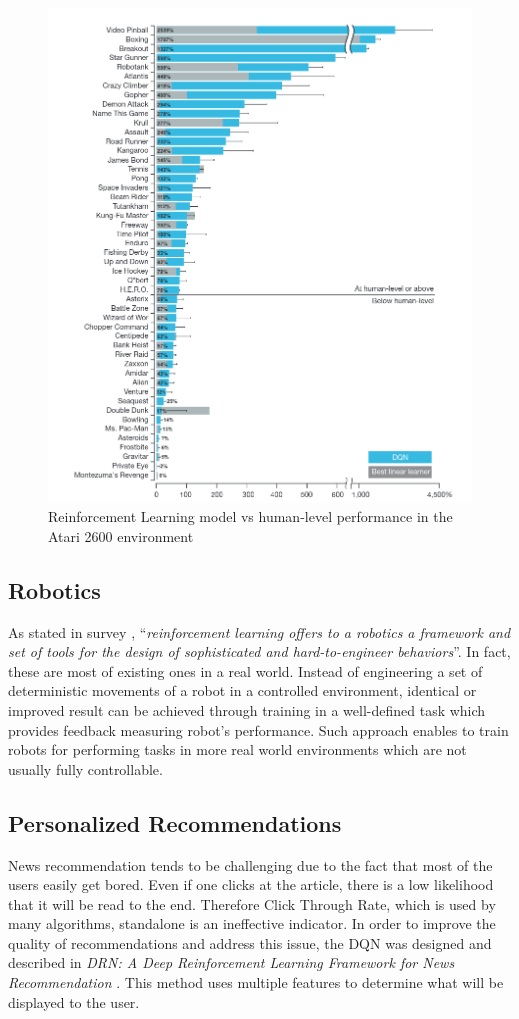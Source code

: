 \begin{figure}[h]
    \includegraphics[width=12cm]{img/Atari2600.png}
    \centering
    \caption{Reinforcement Learning model vs human-level performance in the Atari 2600 environment \cite{DQNAtari}}
    \label{fig:Atari2600}
\end{figure}

\subsection{Robotics}
\label{sub:intro-robotics}
As stated in survey \cite{RNSurvey}, ``\emph{reinforcement learning offers to a robotics a framework and set of tools for the design of sophisticated and hard-to-engineer behaviors}''. In fact, these are most of existing ones in a real world. Instead of engineering a set of deterministic movements of a robot in a controlled environment, identical or improved result can be achieved through training in a well-defined task which provides feedback measuring robot's performance. Such approach enables to train robots for performing tasks in more real world environments which are not usually fully controllable. 

\subsection{Personalized Recommendations}
\label{sub:intro-personalized-reccomendations}
News recommendation tends to be challenging due to the fact that most of the users easily get bored. Even if one clicks at the article, there is a low likelihood that it will be read to the end. Therefore Click Through Rate, which is used by many algorithms, standalone is an ineffective indicator. In order to improve the quality of recommendations and address this issue, the DQN was designed and described in \emph{DRN: A Deep Reinforcement Learning Framework for News Recommendation} \cite{DRNNewsRecommendaiton}. This method uses multiple features to determine what will be displayed to the user.
